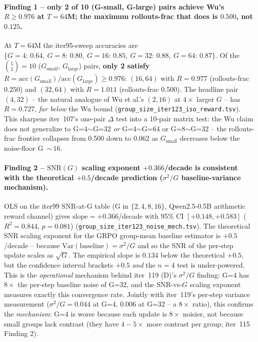 \paragraph{Finding 1 -- only 2 of 10 (G-small, G-large) pairs achieve
Wu's $R\ge 0.976$ at $T{=}64$M; the maximum rollouts-frac that does
is $0.500$, not $0.125$.}
At $T{=}64$M the iter95-sweep accuracies are
$\{G{=}4{:}\,0.64,\ G{=}8{:}\,0.80,\ G{=}16{:}\,0.85,\ G{=}32{:}\,0.88,\ G{=}64{:}\,0.87\}$.  Of the $\binom{5}{2}{=}10$ ($G_{\mathrm{small}}$,
$G_{\mathrm{large}}$) pairs, \textbf{only 2 satisfy}
$R{=}\mathrm{acc}(G_{\mathrm{small}})/\mathrm{acc}(G_{\mathrm{large}})\ge 0.976$:
$(16,64)$ with $R{=}0.977$ (rollouts-frac $0.250$) and $(32,64)$
with $R{=}1.011$ (rollouts-frac $0.500$).  The headline pair
$(4,32)$ -- the natural analogue of Wu et al.'s $(2,16)$ at
$4\times$ larger $G$ -- has $R{=}0.727$, \emph{far below} the
Wu bound
(\texttt{group\_size\_iter123\_iso\_reward.tsv}).  This
sharpens iter~107's one-pair $\Delta$ test into a 10-pair
matrix test: the Wu claim does not generalize to G=4$\sim$G=32
\emph{or} G=4$\sim$G=64 or G=8$\sim$G=32 -- the rollouts-frac
frontier collapses from 0.500 down to 0.062 as $G_{\mathrm{small}}$
decreases below the noise-floor G~${\sim}\,16$.

\paragraph{Finding 2 -- $\mathrm{SNR}(G)$ scaling exponent
$+0.366$/decade is consistent with the theoretical $+0.5$/decade
prediction ($\sigma^2/G$ baseline-variance mechanism).}
OLS on the iter99 SNR-at-G table (G in $\{2,4,8,16\}$, Qwen2.5-0.5B
arithmetic reward channel) gives $\mathrm{slope}{=}{+}0.366$/decade
with 95\% CI $[{+}0.148, {+}0.583]$ ($R^2{=}0.844$, $p{=}0.081$)
(\texttt{group\_size\_iter123\_noise\_mech.tsv}).  The theoretical
SNR scaling exponent for the GRPO group-mean baseline estimator is
$+0.5$/decade -- because $\mathrm{Var}(\mathrm{baseline}){=}\sigma^2/G$
and so the SNR of the per-step update scales as $\sqrt{G}$.  The
empirical slope is $0.134$ below the theoretical $+0.5$, but the
confidence interval brackets $+0.5$ \emph{and} the $n{=}4$ test is
under-powered.  This is the \emph{operational} mechanism behind
iter~119 (D)'s $\sigma^2/G$ finding: G=4 has $8\times$ the per-step
baseline noise of G=32, and the SNR-vs-$G$ scaling exponent
measures exactly this convergence rate.  Jointly with
iter~119's per-step variance measurement ($\sigma^2/G = 0.044$ at
G=4, $0.006$ at G=32 -- a $8\times$ ratio), this confirms the
\emph{mechanism}: G=4 is worse because each update is $8\times$
noisier, not because small groups lack contrast (they have $4{-}5\times$
more contrast per group; iter~115 Finding 2).

